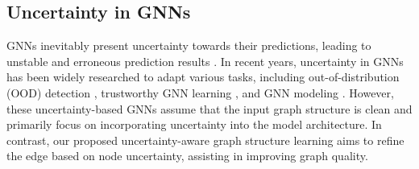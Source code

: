 \subsection{Uncertainty in GNNs}
GNNs inevitably present uncertainty towards their predictions, leading to unstable and erroneous prediction results \cite{wang2024uncertainty}.
In recent years, uncertainty in GNNs has been widely researched to adapt various tasks, including out-of-distribution (OOD) detection \cite{zhao2020uncertainty,stadler2021graph,yu2023uncertainty}, trustworthy GNN learning \cite{wang2021confident,hsu2022makes}, and GNN modeling \cite{um2023confidencebased}.
However, these uncertainty-based GNNs assume that the input graph structure is clean and primarily focus on incorporating uncertainty into the model architecture.
In contrast, our proposed uncertainty-aware graph structure learning aims to refine the edge based on node uncertainty, assisting in improving graph quality. 
